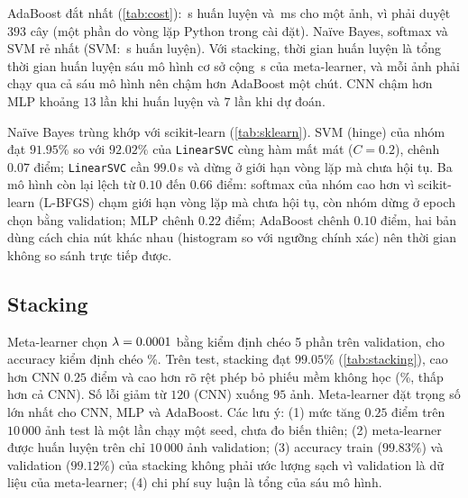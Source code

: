 AdaBoost đắt nhất (\cref{tab:cost}): \fitADA\,s huấn luyện và \latADA\,ms cho một ảnh, vì phải duyệt $393$ cây (một phần do vòng lặp Python trong cài đặt). Naïve Bayes, softmax và SVM rẻ nhất (SVM: \svmFit\,s huấn luyện). Với stacking, thời gian huấn luyện là tổng thời gian huấn luyện sáu mô hình cơ sở cộng \stackMetaFit\,s của meta-learner, và mỗi ảnh phải chạy qua cả sáu mô hình nên chậm hơn AdaBoost một chút. CNN chậm hơn MLP khoảng $13$ lần khi huấn luyện và $7$ lần khi dự đoán.

\begin{table}[tbp]
\centering\small

\caption{Bản tự cài đặt và scikit-learn với cùng siêu tham số: accuracy test (\%), hiệu tuyệt đối và thời gian huấn luyện.}
\label{tab:sklearn}
\end{table}

Naïve Bayes trùng khớp với scikit-learn (\cref{tab:sklearn}). SVM (hinge) của nhóm đạt $91.95\%$ so với $92.02\%$ của \texttt{LinearSVC} cùng hàm mất mát ($C=0.2$), chênh $0.07$ điểm; \texttt{LinearSVC} cần $99.0$\,s và dừng ở giới hạn vòng lặp mà chưa hội tụ. Ba mô hình còn lại lệch từ $0.10$ đến $0.66$ điểm: softmax của nhóm cao hơn vì scikit-learn (L-BFGS) chạm giới hạn vòng lặp mà chưa hội tụ, còn nhóm dừng ở epoch chọn bằng validation; MLP chênh $0.22$ điểm; AdaBoost chênh $0.10$ điểm, hai bản dùng cách chia nút khác nhau (histogram so với ngưỡng chính xác) nên thời gian không so sánh trực tiếp được.


\subsection{Stacking}
\label{sec:stack-results}
\begin{table}[H]
\centering\small

\caption{Accuracy test của các mô hình cơ sở, của bỏ phiếu mềm và của stacking; cột cuối là trị tuyệt đối trung bình (TB) của trọng số meta-learner ứng với từng mô hình cơ sở (đặc trưng đã chuẩn hóa). Bỏ phiếu mềm lấy trung bình xác suất của các mô hình có xác suất, không học gì thêm.}
\label{tab:stacking}
\end{table}

Meta-learner chọn $\lambda=0.0001$ bằng kiểm định chéo 5 phần trên validation, cho accuracy kiểm định chéo \stackCV\%. Trên test, stacking đạt $99.05\%$ (\cref{tab:stacking}), cao hơn CNN $0.25$ điểm và cao hơn rõ rệt phép bỏ phiếu mềm không học (\stackVote\%, thấp hơn cả CNN). Số lỗi giảm từ $120$ (CNN) xuống $95$ ảnh. Meta-learner đặt trọng số lớn nhất cho CNN, MLP và AdaBoost. Các lưu ý: (1) mức tăng $0.25$ điểm trên $10\,000$ ảnh test là một lần chạy một seed, chưa đo biến thiên; (2) meta-learner được huấn luyện trên chỉ $10\,000$ ảnh validation; (3) accuracy train ($99.83\%$) và validation ($99.12\%$) của stacking không phải ước lượng sạch vì validation là dữ liệu của meta-learner; (4) chi phí suy luận là tổng của sáu mô hình.

